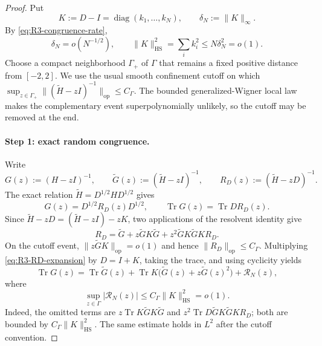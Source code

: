 \documentclass[11pt]{article}
\theoremstyle{definition}
\theoremstyle{remark}
\newcommand{\Tr}{\operatorname{Tr}}
\newcommand{\diag}{\operatorname{diag}}
\newcommand{\op}{\mathrm{op}}
\newcommand{\HS}{\mathrm{HS}}
\newcommand{\norm}[1]{\lVert #1\rVert}
\begin{document}
\begin{proof}
Put
\begin{equation}\label{eq:R3-K-definition}
 K:=D-I=\diag(k_1,\ldots,k_N),
 \qquad \delta_N:=\norm{K}_\infty.
\end{equation}
By \eqref{eq:R3-congruence-rate},
\begin{equation}\label{eq:R3-K-rates}
 \delta_N=o(N^{-1/2}),
 \qquad
 \norm{K}_{\HS}^2=\sum_i k_i^2\le N\delta_N^2=o(1).
\end{equation}
Choose a compact neighborhood \(\Gamma_+\) of \(\Gamma\) that remains a
fixed positive distance from \([-2,2]\).  We use the usual smooth confinement
cutoff on which
\(\sup_{z\in\Gamma_+}\norm{(\widetilde H-zI)^{-1}}_{\op}\le C_\Gamma\).
The bounded generalized-Wigner local law makes the complementary event
superpolynomially unlikely, so the cutoff may be removed at the end.

\paragraph{Step 1: exact random congruence.}
Write
\[
 G(z):=(H-zI)^{-1},\qquad
 \widetilde G(z):=(\widetilde H-zI)^{-1},\qquad
 R_D(z):=(\widetilde H-zD)^{-1}.
\]
The exact relation \(\widetilde H=D^{1/2}HD^{1/2}\) gives
\begin{equation}\label{eq:R3-exact-congruence}
 G(z)=D^{1/2}R_D(z)D^{1/2},
 \qquad \Tr G(z)=\Tr DR_D(z).
\end{equation}
Since \(\widetilde H-zD=(\widetilde H-zI)-zK\), two applications of the
resolvent identity give
\begin{equation}\label{eq:R3-RD-expansion}
 R_D=\widetilde G+z\widetilde G K\widetilde G
 +z^2\widetilde G K\widetilde G K R_D.
\end{equation}
On the cutoff event, \(\norm{z\widetilde G K}_{\op}=o(1)\) and hence
\(\norm{R_D}_{\op}\le C_\Gamma\).  Multiplying
\eqref{eq:R3-RD-expansion} by \(D=I+K\), taking the trace, and using cyclicity
yields
\begin{equation}\label{eq:R3-random-congruence-expansion}
 \Tr G(z)=\Tr\widetilde G(z)
 +\Tr K\bigl(\widetilde G(z)+z\widetilde G(z)^2\bigr)
 +\mathcal R_N(z),
\end{equation}
where
\begin{equation}\label{eq:R3-random-congruence-rem}
 \sup_{z\in\Gamma}|\mathcal R_N(z)|
 \le C_\Gamma\norm{K}_{\HS}^2=o(1).
\end{equation}
Indeed, the omitted terms are
\(z\Tr K\widetilde G K\widetilde G\) and
\(z^2\Tr D\widetilde G K\widetilde G K R_D\); both are bounded by
\(C_\Gamma\norm{K}_{\HS}^2\).  The same estimate holds in \(L^2\) after the
cutoff convention.


\end{proof}
\end{document}
